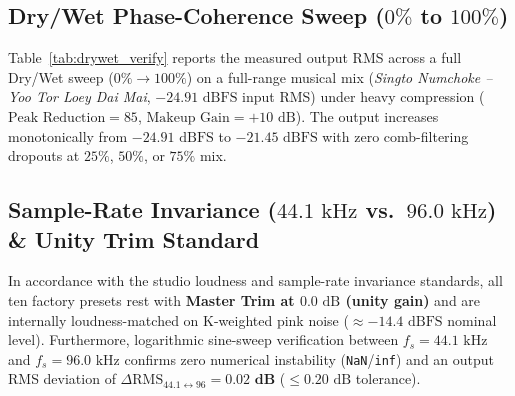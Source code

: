 \documentclass[11pt,a4paper]{article}
\begin{document}
\subsection{Dry/Wet Phase-Coherence Sweep (\texorpdfstring{$0\%$ to $100\%$}{0\% to 100\%})}

Table~\ref{tab:drywet_verify} reports the measured output RMS across a full Dry/Wet sweep ($0\% \to 100\%$) on a full-range musical mix (\emph{Singto Numchoke -- Yoo Tor Loey Dai Mai}, $-24.91\text{ dBFS}$ input RMS) under heavy compression ($\text{Peak Reduction} = 85$, $\text{Makeup Gain} = +10\text{ dB}$). The output increases monotonically from $-24.91\text{ dBFS}$ to $-21.45\text{ dBFS}$ with zero comb-filtering dropouts at $25\%$, $50\%$, or $75\%$ mix.

\begin{table}[H]
\centering
\caption{Measured Output RMS Across Parallel Dry/Wet Mix Settings ($4\times$ Polyphase Oversampling)}
\label{tab:drywet_verify}
\vspace{0.3em}
\end{table}

\subsection{Sample-Rate Invariance (\texorpdfstring{$44.1\text{ kHz}$ vs.\ $96.0\text{ kHz}$}{44.1 kHz vs. 96.0 kHz}) \& Unity Trim Standard}

In accordance with the studio loudness and sample-rate invariance standards, all ten factory presets rest with \textbf{Master Trim at $0.0\text{ dB}$ (unity gain)} and are internally loudness-matched on K-weighted pink noise ($\approx -14.4\text{ dBFS}$ nominal level). Furthermore, logarithmic sine-sweep verification between $f_s = 44.1\text{ kHz}$ and $f_s = 96.0\text{ kHz}$ confirms zero numerical instability (\texttt{NaN}/\texttt{inf}) and an output RMS deviation of $\Delta\text{RMS}_{44.1 \leftrightarrow 96} = \mathbf{0.02\text{ dB}}$ ($\le 0.20\text{ dB}$ tolerance).
\end{document}

